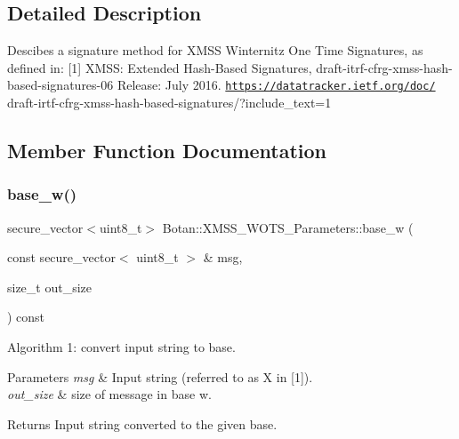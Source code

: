 \subsection{Detailed Description}
Descibes a signature method for X\+M\+SS Winternitz One Time Signatures, as defined in\+: \mbox{[}1\mbox{]} X\+M\+SS\+: Extended Hash-\/\+Based Signatures, draft-\/itrf-\/cfrg-\/xmss-\/hash-\/based-\/signatures-\/06 Release\+: July 2016. \href{https://datatracker.ietf.org/doc/}{\tt https\+://datatracker.\+ietf.\+org/doc/} draft-\/irtf-\/cfrg-\/xmss-\/hash-\/based-\/signatures/?include\+\_\+text=1 

\subsection{Member Function Documentation}
\mbox{\label{class_botan_1_1_x_m_s_s___w_o_t_s___parameters_a1c4baa29d0136109302bbe72639620ab}} 
\subsubsection{\texorpdfstring{base\+\_\+w()}{base\_w()}}
{\footnotesize\ttfamily secure\+\_\+vector$<$uint8\+\_\+t$>$ Botan\+::\+X\+M\+S\+S\+\_\+\+W\+O\+T\+S\+\_\+\+Parameters\+::base\+\_\+w (\begin{DoxyParamCaption}\item[{const secure\+\_\+vector$<$ uint8\+\_\+t $>$ \&}]{msg,  }\item[{size\+\_\+t}]{out\+\_\+size }\end{DoxyParamCaption}) const}

Algorithm 1\+: convert input string to base.


\begin{DoxyParams}{Parameters}
{\em msg} & Input string (referred to as X in \mbox{[}1\mbox{]}). \\
\hline
{\em out\+\_\+size} & size of message in base w.\\
\hline
\end{DoxyParams}
\begin{DoxyReturn}{Returns}
Input string converted to the given base. 
\end{DoxyReturn}
\mbox{\label{class_botan_1_1_x_m_s_s___w_o_t_s___parameters_a41865ec18f86aa5a995de1c452df2b65}} 
